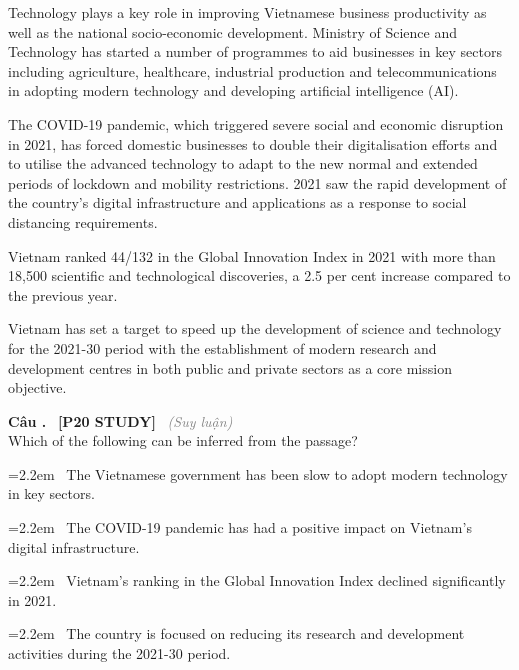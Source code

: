 \documentclass[12pt,a4paper,twoside]{article}
\newcounter{qcounter}
\newcommand{\question}[2][]{%
    \stepcounter{qcounter}%
    \par\vspace{6pt}%
    \noindent\textcolor{primaryBlue}{\textbf{Câu \theqcounter.}}~%
    \textcolor{secondaryBlue}{\small\textbf{[P20 STUDY]}}~%
    \if\relax\detokenize{#1}\relax\else\textcolor{gray}{\small\textit{(#1)}}~\fi\\[1pt]
    \noindent #2%
}
\newcommand{\choiceitem}[2]{%
    \tikz[baseline=-0.5ex]{%
        \node[draw=primaryBlue, circle, minimum size=1.5em, inner sep=0pt, thick] {\textbf{#1}};%
    }~#2%
}
\newenvironment{readingpassage}[1][]{%
    \begin{tcolorbox}[enhanced, colback=grayLight, colframe=secondaryBlue,
        coltitle=textDark, fonttitle=\bfseries, title={#1},
        rounded corners, arc=3mm, boxrule=1pt,
        left=15pt, right=15pt, top=10pt, bottom=10pt,
        breakable, before skip=10pt, after skip=10pt, drop fuzzy shadow]
    \setstretch{1.3}
}{\end{tcolorbox}}
\begin{document}
\begin{readingpassage}[]
Technology plays a key role in improving Vietnamese business productivity as well as the national socio-economic development. Ministry of Science and Technology has started a number of programmes to aid businesses in key sectors including agriculture, healthcare, industrial production and telecommunications in adopting modern technology and developing artificial intelligence (AI).

The COVID-19 pandemic, which triggered severe social and economic disruption in 2021, has forced domestic businesses to double their digitalisation efforts and to utilise the advanced technology to adapt to the new normal and extended periods of lockdown and mobility restrictions. 2021 saw the rapid development of the country’s digital infrastructure and applications as a response to social distancing requirements.

Vietnam ranked 44/132 in the Global Innovation Index in 2021 with more than 18,500 scientific and technological discoveries, a 2.5 per cent increase compared to the previous year.

Vietnam has set a target to speed up the development of science and technology for the 2021-30 period with the establishment of modern research and development centres in both public and private sectors as a core mission objective.
\end{readingpassage}

\question[Suy luận]{Which of the following can be inferred from the passage?}

\par\vspace{4pt}
\noindent\hangindent=2.2em\choiceitem{A}{The Vietnamese government has been slow to adopt modern technology in key sectors.}\par\vspace{4pt}
\noindent\hangindent=2.2em\choiceitem{B}{The COVID-19 pandemic has had a positive impact on Vietnam's digital infrastructure.}\par\vspace{4pt}
\noindent\hangindent=2.2em\choiceitem{C}{Vietnam's ranking in the Global Innovation Index declined significantly in 2021.}\par\vspace{4pt}
\noindent\hangindent=2.2em\choiceitem{D}{The country is focused on reducing its research and development activities during the 2021-30 period.}\par\vspace{4pt}
\end{document}

